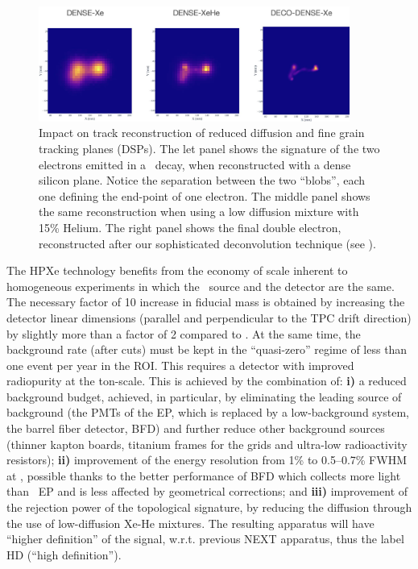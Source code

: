 \begin{figure}
  \begin{center}
      \includegraphics[width=0.91\textwidth]{img2/tracks.jpg}
    \caption{Impact on track reconstruction of reduced diffusion and fine grain tracking planes (DSPs). The let panel shows the signature of the two electrons emitted in a \bb\ decay, when reconstructed with a dense silicon plane. Notice the separation between the two ``blobs'', each one defining the end-point of one electron. The middle panel shows the same reconstruction when using a low diffusion mixture with 15\% Helium. The right panel shows the final double electron, reconstructed after our sophisticated deconvolution technique (see \cite{NEXT:2020jmz}).} 
    \label{fig.DSP}
  \end{center}
\end{figure}


 The HPXe technology benefits from the economy of scale inherent to homogeneous experiments in which the \bbonu\ source and the detector are the same. The necessary factor of 10 increase in fiducial mass is obtained by increasing the detector linear dimensions (parallel and perpendicular to the TPC drift direction) by slightly more than a factor of 2 compared to \NEXT. At the same time, the background rate (after cuts) must be kept in the ``quasi-zero'' regime of less than one event per year in the ROI. This requires a detector with improved radiopurity at the ton-scale. This is achieved by the combination of: {\bf i)} a reduced background budget, achieved, in particular, by eliminating the leading source of background (the PMTs of the EP, which is replaced by a low-background system, the barrel fiber detector, BFD) and further reduce other background sources (thinner kapton boards, titanium frames for the grids and ultra-low radioactivity resistors);  {\bf ii)} improvement of the energy resolution from 1\% to 0.5--0.7\% FWHM at \Qbb, possible thanks to the better  performance of BFD which collects more light than \Next\ EP and is less affected by geometrical corrections; and {\bf iii)} improvement of the rejection power of the topological signature, by reducing the diffusion through the use of low-diffusion Xe-He mixtures. The resulting apparatus will have ``higher definition'' of the signal, w.r.t. previous NEXT apparatus, thus the label HD (``high definition''). 
 
